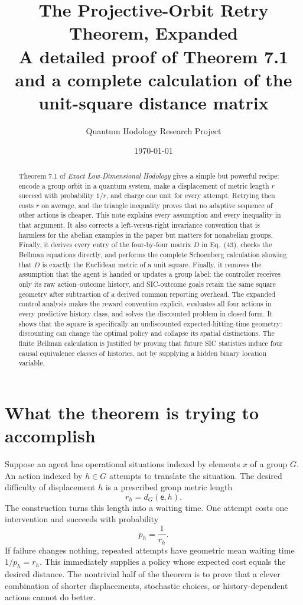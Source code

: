 \documentclass[11pt]{article}
\title{\textbf{The Projective-Orbit Retry Theorem, Expanded}\\
\large A detailed proof of Theorem 7.1 and a complete calculation of the
unit-square distance matrix}
\author{Quantum Hodology Research Project}
\date{\today}
\theoremstyle{definition}
\theoremstyle{remark}
\newcommand{\id}{\mathsf e}
\begin{document}
\maketitle

\begin{abstract}
Theorem 7.1 of \emph{Exact Low-Dimensional Hodology} gives a simple but
powerful recipe: encode a group orbit in a quantum system, make a displacement
of metric length \(r\) succeed with probability \(1/r\), and charge one unit
for every attempt. Retrying then costs \(r\) on average, and the triangle
inequality proves that no adaptive sequence of other actions is cheaper.
This note explains every assumption and every inequality in that argument.
It also corrects a left-versus-right invariance convention that is harmless
for the abelian examples in the paper but matters for nonabelian groups.
Finally, it derives every entry of the four-by-four matrix \(D\) in Eq.~(43),
checks the Bellman equations directly, and performs the complete Schoenberg
calculation showing that \(D\) is exactly the Euclidean metric of a unit
square. Finally, it removes the assumption that the agent is handed or updates
a group label: the controller receives only its raw action--outcome history,
and SIC-outcome goals retain the same square geometry after subtraction of a
derived common reporting overhead. The expanded control analysis makes
the reward convention explicit, evaluates all four actions in every
predictive history class,
and solves the discounted problem in closed form. It shows that the square is
specifically an undiscounted expected-hitting-time geometry: discounting can
change the optimal policy and collapse its spatial distinctions.  The finite
Bellman calculation is justified by proving that future SIC statistics induce
four causal equivalence classes of histories, not by supplying a hidden binary
location variable.
\end{abstract}

\tableofcontents

\section{What the theorem is trying to accomplish}

Suppose an agent has operational situations indexed by elements \(x\) of a
group \(G\). An action indexed by \(h\in G\) attempts to translate the
situation. The desired difficulty of displacement \(h\) is a prescribed
group metric length
\[
  r_h=d_G(\id,h).
\]
The construction turns this length into a waiting time.  One attempt costs
one intervention and succeeds with probability
\[
  p_h=\frac{1}{r_h}.
\]
If failure changes nothing, repeated attempts have geometric mean waiting time
\(1/p_h=r_h\). This immediately supplies a policy whose expected cost equals
the desired distance.  The nontrivial half of the theorem is to prove that a
clever combination of shorter displacements, stochastic choices, or
history-dependent actions cannot do better.
\end{document}
